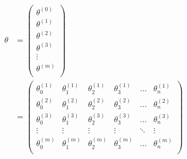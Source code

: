 \documentclass[12pt]{article}   %
\begin{document}
\begin{equation}
\begin{aligned}
\theta & = 
	\left(
		\begin{matrix}
			\theta^{(0)} \\
			\theta^{(1)} \\
			\theta^{(2)} \\
			\theta^{(3)} \\
			\vdots \\
			\theta^{(m)} \\
		\end{matrix}
	\right) \\
& =
	\left(
		\begin{matrix}
		\theta_0^{(1)} & \theta_1^{(1)} & \theta_2^{(1)} & \theta_3^{(1)} & \dots & \theta_n^{(1)} \\
		\theta_0^{(2)} & \theta_1^{(2)} & \theta_2^{(2)} & \theta_3^{(2)} & \dots & \theta_n^{(2)} \\
		\theta_0^{(3)} & \theta_1^{(3)} & \theta_2^{(3)} & \theta_3^{(3)} & \dots & \theta_n^{(3)} \\
		\vdots    & \vdots    & \vdots    & \vdots    & \ddots & \vdots   \\
		\theta_0^{(m)} & \theta_1^{(m)} & \theta_2^{(m)} & \theta_3^{(m)} & \dots & \theta_n^{(m)} \\
		\end{matrix}
	\right)
\end{aligned}
\end{equation}



 
\end{document}
